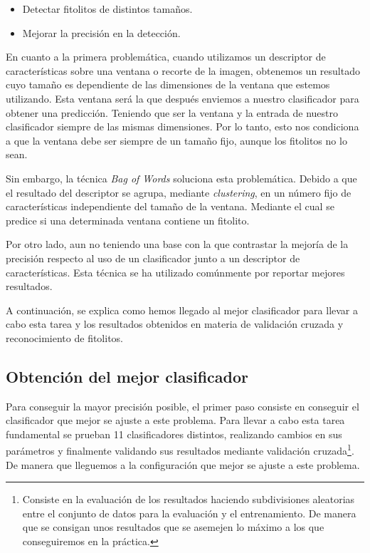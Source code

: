 \begin{itemize}
	\item Detectar fitolitos de distintos tamaños.
	\item Mejorar la precisión en la detección.
\end{itemize}

En cuanto a la primera problemática, cuando utilizamos un descriptor de características sobre una ventana o recorte de la imagen, obtenemos un resultado cuyo tamaño es dependiente de las dimensiones de la ventana que estemos utilizando. Esta ventana será la que después enviemos a nuestro clasificador para obtener una predicción. Teniendo que ser la ventana y la entrada de nuestro clasificador siempre de las mismas dimensiones. Por lo tanto, esto nos condiciona a que la ventana debe ser siempre de un tamaño fijo, aunque los fitolitos no lo sean.

Sin embargo, la técnica \textit{Bag of Words} soluciona esta problemática. Debido a que el resultado del descriptor se agrupa, mediante \textit{clustering}, en un número fijo de características independiente del tamaño de la ventana. Mediante el cual se predice si una determinada ventana contiene un fitolito.

Por otro lado, aun no teniendo una base con la que contrastar la mejoría de la precisión respecto al uso de un clasificador junto a un descriptor de características. Esta técnica se ha utilizado comúnmente por reportar mejores resultados. 

A continuación, se explica como hemos llegado al mejor clasificador para llevar a cabo esta tarea y los resultados obtenidos en materia de validación cruzada y reconocimiento de fitolitos.

\subsection{Obtención del mejor clasificador}

Para conseguir la mayor precisión posible, el primer paso consiste en conseguir el clasificador que mejor se ajuste a este problema. Para llevar a cabo esta tarea fundamental se prueban 11 clasificadores distintos, realizando cambios en sus parámetros y finalmente validando sus resultados mediante validación cruzada\footnote{Consiste en la evaluación de los resultados haciendo subdivisiones aleatorias entre el conjunto de datos para la evaluación y el entrenamiento. De manera que se consigan unos resultados que se asemejen lo máximo a los que conseguiremos en la práctica.}. De manera que lleguemos a la configuración que mejor se ajuste a este problema.

